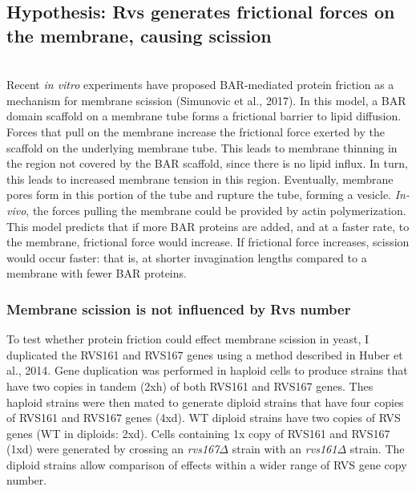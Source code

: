 	\vspace{5mm}




\newpage

\subsection{Hypothesis: Rvs generates frictional forces on the membrane, causing scission}
				\mbox{}\\
Recent \textit{in vitro} experiments have proposed BAR-mediated protein friction as a mechanism for membrane scission (Simunovic et al., 2017). In this model, a BAR domain scaffold on a membrane tube forms a frictional barrier to lipid diffusion. Forces that pull on the membrane increase the frictional force exerted by the scaffold on the underlying membrane tube. This leads to membrane thinning in the region not covered by the BAR scaffold, since there is no lipid influx. In turn, this leads to increased membrane tension in this region. Eventually, membrane pores form in this portion of the tube and rupture the tube, forming a vesicle. \textit{In-vivo}, the forces pulling the membrane could be provided by actin polymerization.
This model predicts that if more BAR proteins are added, and at a faster rate, to the membrane, frictional force would increase. If frictional force increases, scission would occur faster: that is, at shorter invagination lengths compared to a membrane with fewer BAR proteins. 


	\subsubsection{Membrane scission is not influenced by Rvs number}
To test whether protein friction could effect membrane scission in yeast, I duplicated the RVS161 and RVS167 genes using a method described in Huber et al., 2014. Gene duplication was performed in haploid cells to produce strains that have two copies in tandem (2xh) of both RVS161 and RVS167 genes. Thes haploid strains were then mated to generate diploid strains that have four copies of RVS161 and RVS167 genes (4xd). WT diploid strains have two copies of RVS genes (WT in diploids: 2xd). Cells containing 1x copy of RVS161 and RVS167 (1xd) were generated by crossing an \textit{rvs167$\Delta$}
 strain with an \textit{rvs161$\Delta$} strain. The diploid strains allow comparison of effects within a wider range of RVS gene copy number. 



